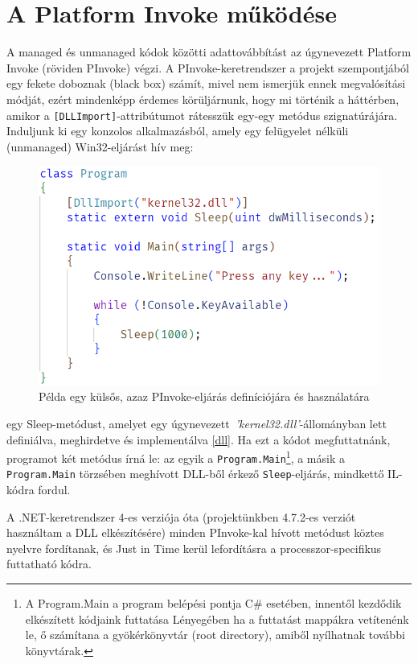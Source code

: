 \documentclass[tocnopagenum]{thesis-ekf}
\theoremstyle{definition}
\theoremstyle{remark}
\begin{document}
	\section{A Platform Invoke működése}
	A managed és unmanaged kódok közötti adattovábbítást az úgynevezett Platform Invoke (röviden PInvoke) végzi. A PInvoke-keretrendszer a projekt szempontjából egy fekete doboznak (black box) számít, mivel nem ismerjük ennek megvalósítási módját, ezért mindenképp érdemes körüljárnunk, hogy mi történik a háttérben, amikor a \verb*|[DLLImport]|-attribútumot rátesszük egy-egy metódus szignatúrájára.
	Induljunk ki egy konzolos alkalmazásból, amely egy felügyelet nélküli (unmanaged) Win32-eljárást hív meg:
	\begin{figure}[h!]
		\centering
		\includegraphics[scale=0.85]{pinvoke_example}
		\caption{Példa egy külsős, azaz PInvoke-eljárás definíciójára és használatára}
		\label{fig_pinvoke_example}
	\end{figure} 
	egy Sleep-metódust, amelyet egy úgynevezett \,\textit{'kernel32.dll'}-állományban lett definiálva, meghirdetve és implementálva \ref{dll}. Ha ezt a kódot megfuttatnánk, programot két metódus írná le: az egyik a \verb*|Program.Main|\footnote{A Program.Main a program belépési pontja C\# esetében, innentől kezdődik elkészített kódjaink futtatása Lényegében ha a futtatást mappákra vetítenénk le, ő számítana a gyökérkönyvtár (root directory), amiből nyílhatnak további könyvtárak.}, a másik a \verb*|Program.Main| törzsében meghívott DLL-ből érkező \verb*|Sleep|-eljárás, mindkettő IL-kódra fordul.
	
	A .NET-keretrendszer 4-es verziója óta (projektünkben 4.7.2-es verziót használtam a DLL elkészítésére) minden PInvoke-kal hívott metódust köztes nyelvre fordítanak, és Just in Time kerül lefordításra a processzor-specifikus futtatható kódra.
	
\end{document}
